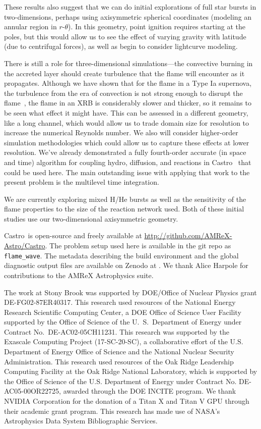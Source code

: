 \documentclass[twocolumn,linenumbers,times,tighten]{aastex631}
\newcommand{\castro}{{\sf Castro}}
\begin{document}
These results also suggest that we can do initial explorations of full
star bursts in two-dimensions, perhaps using axisymmetric spherical
coordinates (modeling an annular region in $r$-$\theta$).  In this
geometry, point ignition requires starting at the poles, but this
would allow us to see the effect of varying gravity with latitude (due
to centrifugal forces), as well as begin to consider lightcurve modeling.

There is still a role for three-dimensional simulations---the
convective burning in the accreted layer should create turbulence that
the flame will encounter as it propagates.  Although we have shown
that for the flame in a Type Ia supernova, the turbulence from the
era of convection is not strong enough to disrupt the
flame~\citep{wdturb}, the flame in an XRB is considerably slower and
thicker, so it remains to be seen what effect it might have.  This can
be assessed in a different geometry, like a long channel, which would
allow us to trade domain size for resolution to increase the numerical
Reynolds number.  We also will consider higher-order simulation
methodologies which could allow us to capture these effects at lower
resolution.  We've already demonstrated a fully fourth-order accurate
(in space and time) algorithm for coupling hydro, diffusion, and
reactions in \castro~\citep{castro-sdc} that could be used here.  The
main outstanding issue with applying that work to the present problem
is the multilevel time integration.

We are currently exploring mixed H/He bursts as well as the
sensitivity of the flame properties to the size of the reaction
network used.  Both of these initial studies use our two-dimensional
axisymmetric geometry.


\begin{acknowledgements}
\castro\ is open-source and freely available at
\url{http://github.com/AMReX-Astro/Castro}.  The problem setup used
here is available in the git repo as {\tt flame\_wave}. The metadata
describing the build environment and the global diagnostic output
files are available on Zenodo at \citet{xrb_data}.  We thank Alice
Harpole for contributions to the AMReX Astrophysics suite.

The work at Stony Brook was supported by DOE/Office of Nuclear
Physics grant DE-FG02-87ER40317.  This research used resources of the
National Energy Research Scientific Computing Center, a DOE Office of
Science User Facility supported by the Office of Science of the
U.~S.\ Department of Energy under Contract No.\ DE-AC02-05CH11231.
This research was supported by the Exascale Computing Project
(17-SC-20-SC), a collaborative effort of the U.S. Department of Energy
Office of Science and the National Nuclear Security Administration.
This research used resources of the Oak Ridge Leadership Computing
Facility at the Oak Ridge National Laboratory, which is supported by
the Office of Science of the U.S. Department of Energy under Contract
No. DE-AC05-00OR22725, awarded through the DOE INCITE program.  We
thank NVIDIA Corporation for the donation of a Titan X and Titan V GPU
through their academic grant program.  This research has made use of
NASA's Astrophysics Data System Bibliographic Services.
\end{acknowledgements}
\end{document}
